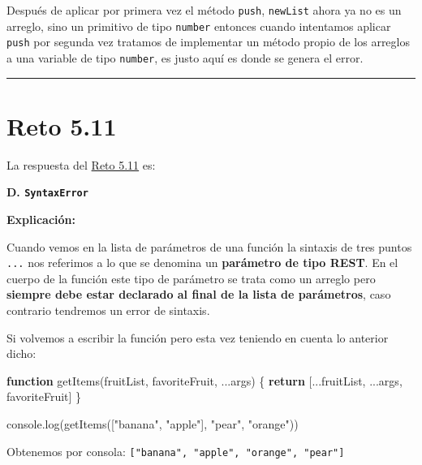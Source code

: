 \documentclass[
  letterpaper,
  DIV=11,
  numbers=noendperiod]{scrreprt}
\newenvironment{Shaded}{\begin{snugshade}}{\end{snugshade}}
\newcommand{\BuiltInTok}[1]{\textcolor[rgb]{0.00,0.23,0.31}{#1}}
\newcommand{\ControlFlowTok}[1]{\textcolor[rgb]{0.00,0.23,0.31}{\textbf{#1}}}
\newcommand{\FunctionTok}[1]{\textcolor[rgb]{0.28,0.35,0.67}{#1}}
\newcommand{\KeywordTok}[1]{\textcolor[rgb]{0.00,0.23,0.31}{\textbf{#1}}}
\newcommand{\NormalTok}[1]{\textcolor[rgb]{0.00,0.23,0.31}{#1}}
\newcommand{\OperatorTok}[1]{\textcolor[rgb]{0.37,0.37,0.37}{#1}}
\newcommand{\StringTok}[1]{\textcolor[rgb]{0.13,0.47,0.30}{#1}}
\begin{document}
Después de aplicar por primera vez el método \texttt{push},
\texttt{newList} ahora ya no es un arreglo, sino un primitivo de tipo
\texttt{number} entonces cuando intentamos aplicar \texttt{push} por
segunda vez tratamos de implementar un método propio de los arreglos a
una variable de tipo \texttt{number}, es justo aquí es donde se genera
el error.

\begin{center}\rule{0.5\linewidth}{0.5pt}\end{center}

\section{Reto 5.11}\label{sec-sol-cap5-reto11}

La respuesta del \hyperref[sec-cap5-reto11]{Reto 5.11} es:

\textbf{D. \texttt{SyntaxError}}

\textbf{Explicación:}

Cuando vemos en la lista de parámetros de una función la sintaxis de
tres puntos \texttt{...} nos referimos a lo que se denomina un
\textbf{parámetro de tipo REST}. En el cuerpo de la función este tipo de
parámetro se trata como un arreglo pero \textbf{siempre debe estar
declarado al final de la lista de parámetros}, caso contrario tendremos
un error de sintaxis.

Si volvemos a escribir la función pero esta vez teniendo en cuenta lo
anterior dicho:

\begin{Shaded}
\begin{Highlighting}[]
\KeywordTok{function} \FunctionTok{getItems}\NormalTok{(fruitList}\OperatorTok{,}\NormalTok{ favoriteFruit}\OperatorTok{,} \OperatorTok{...}\NormalTok{args) \{}
  \ControlFlowTok{return}\NormalTok{ [}\OperatorTok{...}\NormalTok{fruitList}\OperatorTok{,} \OperatorTok{...}\NormalTok{args}\OperatorTok{,}\NormalTok{ favoriteFruit]}
\NormalTok{\}}

\BuiltInTok{console}\OperatorTok{.}\FunctionTok{log}\NormalTok{(}\FunctionTok{getItems}\NormalTok{([}\StringTok{"banana"}\OperatorTok{,} \StringTok{"apple"}\NormalTok{]}\OperatorTok{,} \StringTok{"pear"}\OperatorTok{,} \StringTok{"orange"}\NormalTok{))}
\end{Highlighting}
\end{Shaded}

Obtenemos por consola:
\texttt{{[}"banana",\ "apple",\ "orange",\ "pear"{]}}
\end{document}
